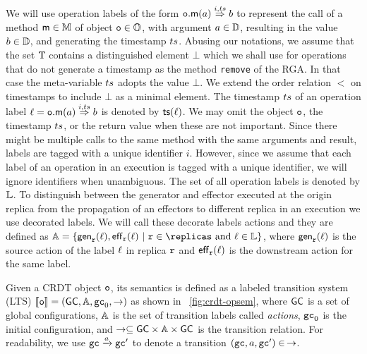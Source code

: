 We will use operation labels of the form
${{\mathtt{o}.\mathsf{m}}}(a) \overset{i,ts}{\Rightarrow} b$ to represent the call of a
method $\mathsf{m} \in \mathbb{M}$ of object $\mathtt{o}\in \mathbb{O}$, with
argument $a \in \mathbb{D}$, resulting in the value $b \in
\mathbb{D}$, and generating the timestamp $ts$.
Abusing our notations, we assume that the set $\mathbb{T}$
contains a distinguished element $\bot$ which we shall use for
operations that do not generate a timestamp as the method {\tt remove}
of the RGA.
In that case the meta-variable $ts$ adopts the value $\bot$. We extend the order
relation $<$ on timestamps to include $\bot$ as a minimal element.
The timestamp $ts$ of an operation label $\ell={{\mathtt{o}.\mathsf{m}}}(a) \overset{i,ts}{\Rightarrow} b$
is denoted by $\mathsf{ts}(\ell)$.
We may omit the object $\mathtt{o}$, the timestamp $ts$, or the return
value when these are not important.
Since there might be multiple calls to the same method with the same
arguments and result, labels are tagged with a unique identifier $i$.
However, since we assume that each label of an operation in an
execution is tagged with a unique identifier, we will ignore
identifiers when unambiguous.
The set of all operation labels is denoted by $\mathbb{L}$.
%
To distinguish between the generator and effector executed at the
origin replica from the propagation of an effectors to different replica
in an execution we use decorated labels.
%
We will call these decorate labels actions and they are defined as
$\acts = \{ \src{\arep}{\alabel}, \dwn{\arep}{\alabel}\ |\ \arep \in
\replicas\ \text{and}\ \alabel \in \labels \}$,
where $\mathsf{gen}_{\mathtt{r}}(\ell)$ is the source action of the label
$\ell$ in replica $\mathtt{r}$ and
$\mathsf{eff}_{\mathtt{r}}(\ell)$ is the downstream action for the same label.



Given a CRDT object $\mathtt{o}$, its semantics is defined as a labeled transition
system (LTS) $\llbracket \mathtt{o} \rrbracket =
(\mathsf{GC},\mathbb{A},\mathtt{gc}_0,\rightarrow)$ as shown in
\figurename~\ref{fig:crdt-opsem}, where $\mathsf{GC}$ is a set of
global configurations, $\mathbb{A}$ is the set of transition labels called \emph{actions},
$\mathtt{gc}_0$ is the initial configuration, and
$\rightarrow\subseteq \mathsf{GC} \times \mathbb{A}\times \mathsf{GC}$ is the
transition relation. For readability, we use $\mathtt{gc} \xrightarrow{a} \mathtt{gc}'$
to denote a transition $(\mathtt{gc},a,\mathtt{gc}')\in\,\rightarrow$.

